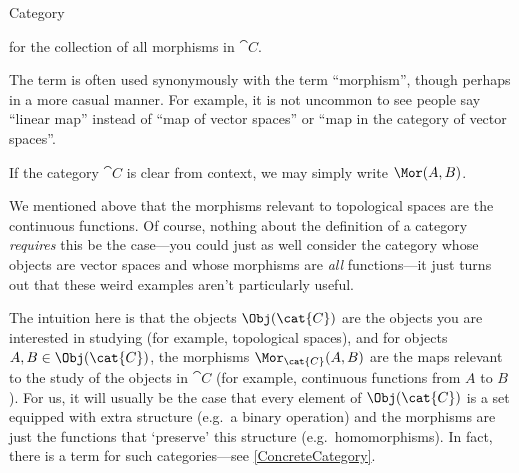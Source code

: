 \begin{dfn}{Category}{}
\begin{rmk}
for the collection of all morphisms in $\cat{C}$.
\end{rmk}
\begin{rmk}
The term  is often used synonymously with the term ``morphism'', though perhaps in a more casual manner.  For example, it is not uncommon to see people say ``linear map'' instead of ``map of vector spaces'' or ``map in the category of vector spaces''.
\end{rmk}
\begin{rmk}
If the category $\cat{C}$ is clear from context, we may simply write $\Mor (A,B)$.
\end{rmk}
\begin{rmk}	We mentioned above that the morphisms relevant to topological spaces are the continuous functions.  Of course, nothing about the definition of a category \emph{requires} this be the case---you could just as well consider the category whose objects are vector spaces and whose morphisms are \emph{all} functions---it just turns out that these weird examples aren't particularly useful.
\end{rmk}
\end{dfn}
The intuition here is that the objects $\Obj (\cat{C})$ are the objects you are interested in studying (for example, topological spaces), and for objects $A,B\in \Obj (\cat{C})$, the morphisms $\Mor _{\cat{C}}(A,B)$ are the maps relevant to the study of the objects in $\cat{C}$ (for example, continuous functions from $A$ to $B$).  For us, it will usually be the case that every element of $\Obj (\cat{C})$ is a set equipped with extra structure (e.g.~a binary operation) and the morphisms are just the functions that `preserve' this structure (e.g.~homomorphisms).  In fact, there is a term for such categories---see \cref{ConcreteCategory}.

